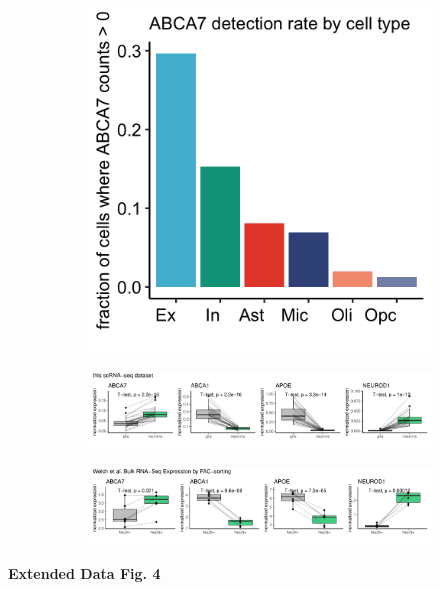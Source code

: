 \begin{figure}[H]
    \begin{subfigure}[t]{.25\textwidth}
        \caption{}
        \includegraphics[width=\textwidth]{../paper/extended_plots/abca7_detection_rate.png}        
    \end{subfigure}
    \par
    \begin{subfigure}[t]{\textwidth}
        \caption{}
        \includegraphics[width=\textwidth]{../paper/extended_plots/scRNAseq_bulk_rna.pdf}        
    \end{subfigure}
    \par
    \begin{subfigure}[t]{\textwidth}
        \caption{}
        \includegraphics[width=\textwidth]{../paper/extended_plots/welch_et_al_bulk_rna.pdf}        
    \end{subfigure}
\end{figure}
\textbf{Extended Data Fig. 4}